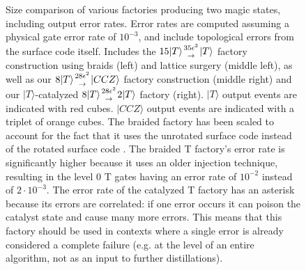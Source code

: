 \documentclass[twocolumn,accepted=2019-03-30]{quantumarticle}
\newcommand{\factory}[3]{$#1 \genfrac{}{}{0pt}{}{#2}{\rightarrow} {#3}$ factory}
\begin{document}
\begin{figure}
  \label{fig:overview-3d}
  \caption{
    Size comparison of various factories producing two magic states, including output error rates.
    Error rates are computed assuming a physical gate error rate of $10^{-3}$, and include topological errors from the surface code itself.
    Includes the \factory{15|T\rangle}{35 \epsilon^3}{|T\rangle} construction using braids \cite{fowler2012bridge} (left) and lattice surgery \cite{fowler2018} (middle left), as well as our \factory{8|T\rangle}{28\epsilon^2}{|CCZ\rangle} construction (middle right) and our $|T\rangle$-catalyzed \factory{8|T\rangle}{28\epsilon^2}{2|T\rangle} (right).
    $|T\rangle$ output events are indicated with red cubes.
    $|CCZ\rangle$ output events are indicated with a triplet of orange cubes.
    The braided factory has been scaled to account for the fact that it uses the unrotated surface code instead of the rotated surface code \cite{horsman2012}.
    The braided T factory's error rate is significantly higher because it uses an older injection technique, resulting in the level 0 T gates having an error rate of $10^{-2}$ instead of $2 \cdot 10^{-3}$.
    The error rate of the catalyzed T factory has an asterisk because its errors are correlated: if one error occurs it can poison the catalyst state and cause many more errors.
    This means that this factory should be used in contexts where a single error is already considered a complete failure (e.g. at the level of an entire algorithm, not as an input to further distillations).
  }
\end{figure}
\end{document}
